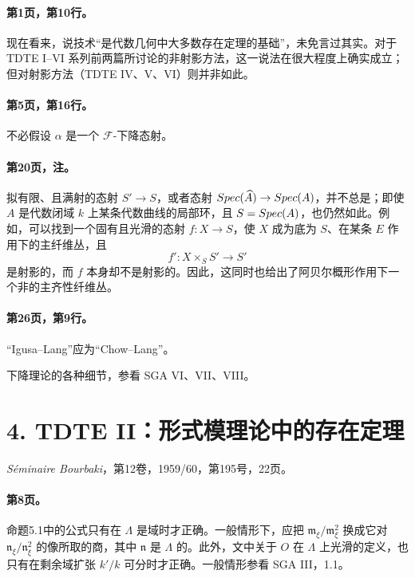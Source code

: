 \paragraph{第1页，第10行。}现在看来，说技术“是代数几何中大多数存在定理的基础”，未免言过其实。对于 TDTE I--VI 系列前两篇所讨论的非射影方法，这一说法在很大程度上确实成立；但对射影方法（TDTE IV、V、VI）则并非如此。

\paragraph{第5页，第16行。}不必假设 $\alpha$ 是一个 $\mathcal F$-下降态射。

\paragraph{第20页，注。}拟有限、且满射的态射 $S'\to S$，或者态射 $Spec(\widehat A)\to Spec(A)$，并不总是；即使 $A$ 是代数闭域 $k$ 上某条代数曲线的局部环，且 $S=Spec(A)$，也仍然如此。例如，可以找到一个固有且光滑的态射 $f\colon X\to S$，使 $X$ 成为底为 $S$、在某条 $E$ 作用下的主纤维丛，且
\[
f'\colon X\times_S S'\longrightarrow S'
\]
是射影的，而 $f$ 本身却不是射影的。因此，这同时也给出了阿贝尔概形作用下一个非的主齐性纤维丛。

\paragraph{第26页，第9行。}“Igusa--Lang”应为“Chow--Lang”。

下降理论的各种细节，参看 SGA VI、VII、VIII。

\section*{4. TDTE II：形式模理论中的存在定理}
\noindent\textit{Séminaire Bourbaki}，第12卷，1959/60，第195号，22页。

\paragraph{第8页。}命题5.1中的公式只有在 $\Lambda$ 是域时才正确。一般情形下，应把 $\mathfrak m_\xi/\mathfrak m_\xi^2$ 换成它对 $\mathfrak n_\xi/\mathfrak n_\xi^2$ 的像所取的商，其中 $\mathfrak n$ 是 $\Lambda$ 的。此外，文中关于 $O$ 在 $\Lambda$ 上光滑的定义，也只有在剩余域扩张 $k'/k$ 可分时才正确。一般情形参看 SGA III，1.1。

